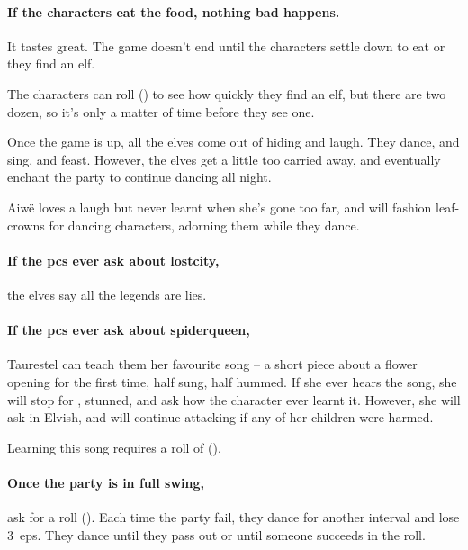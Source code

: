 \paragraph{If the characters eat the food, nothing bad happens.}
It tastes great.
The game doesn't end until the characters settle down to eat or they find an elf.

The characters can roll  (\tn[8]) to see how quickly they find an elf, but there are two dozen, so it's only a matter of time before they see one.

Once the game is up, all the elves come out of hiding and laugh.
They dance, and sing, and feast.
However, the elves get a little too carried away, and eventually enchant the party to continue dancing all night.


Aiw\"{e} loves a laugh but never learnt when she's gone too far, and will fashion leaf-crowns for dancing characters, adorning them while they dance.


\showStdSpells


\paragraph{If the \glspl{pc} ever ask about \gls{lostcity},}
the elves say all the legends are lies.

\paragraph{If the \glspl{pc} ever ask about \gls{spiderqueen},}
Taurestel can teach them her favourite song -- a short piece about a flower opening for the first time, half sung, half hummed.
If she ever hears the song, she will stop for , stunned, and ask how the character ever learnt it.
However, she will ask in Elvish, and will continue attacking if any of her children were harmed.

Learning this song requires a roll of  (\tn[10]).

\paragraph{Once the party is in full swing,}
ask for a  roll (\tn[12]).
Each time the party fail, they dance for another \gls{interval} and lose 3~\glspl{ep}.
They dance until they pass out or until someone succeeds in the roll.

